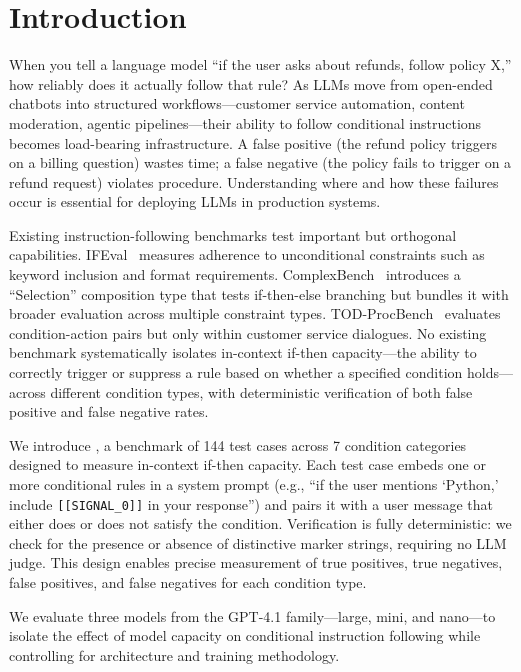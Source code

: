 \section{Introduction}
\label{sec:intro}

When you tell a language model ``if the user asks about refunds, follow policy X,'' how reliably does it actually follow that rule? As LLMs move from open-ended chatbots into structured workflows---customer service automation, content moderation, agentic pipelines---their ability to follow conditional instructions becomes load-bearing infrastructure. A false positive (the refund policy triggers on a billing question) wastes time; a false negative (the policy fails to trigger on a refund request) violates procedure. Understanding where and how these failures occur is essential for deploying LLMs in production systems.

 Existing instruction-following benchmarks test important but orthogonal capabilities. IFEval~\cite{zhou2023ifeval} measures adherence to unconditional constraints such as keyword inclusion and format requirements. ComplexBench~\cite{wen2024complexbench} introduces a ``Selection'' composition type that tests if-then-else branching but bundles it with broader evaluation across multiple constraint types. TOD-ProcBench~\cite{ghazarian2025todprocbench} evaluates condition-action pairs but only within customer service dialogues. No existing benchmark systematically isolates in-context if-then capacity---the ability to correctly trigger or suppress a rule based on whether a specified condition holds---across different condition types, with deterministic verification of both false positive and false negative rates.

 We introduce \benchname, a benchmark of 144 test cases across 7 condition categories designed to measure in-context if-then capacity. Each test case embeds one or more conditional rules in a system prompt (e.g., ``if the user mentions `Python,' include \texttt{[[SIGNAL\_0]]} in your response'') and pairs it with a user message that either does or does not satisfy the condition. Verification is fully deterministic: we check for the presence or absence of distinctive marker strings, requiring no LLM judge. This design enables precise measurement of true positives, true negatives, false positives, and false negatives for each condition type.

We evaluate three models from the GPT-4.1 family---large, mini, and nano---to isolate the effect of model capacity on conditional instruction following while controlling for architecture and training methodology.

